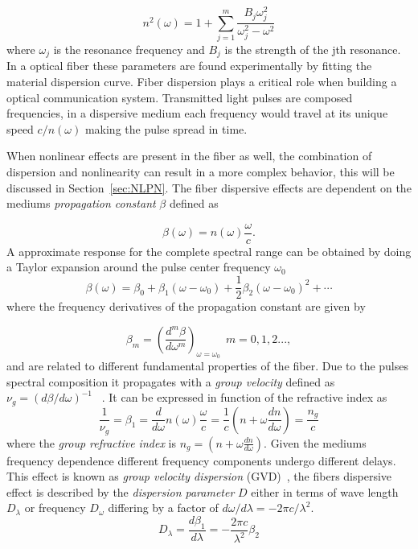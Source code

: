 \begin{equation}
n^2(\omega)=1+\sum^m_{j=1}\frac{B_j\omega^2_j}{\omega^2_j-\omega^2}
\end{equation}
 where $\omega_j$ is the resonance frequency and $B_j$ is the strength of the jth resonance. In a optical fiber these parameters are found experimentally by fitting the material dispersion curve. Fiber dispersion plays a critical role when building a optical communication system. Transmitted light pulses are composed frequencies, in a dispersive medium each frequency would travel at its unique speed $c/n(\omega)$ making the pulse spread in time.
 
 When nonlinear effects are present in the fiber as well, the combination of dispersion and nonlinearity can result in a more complex behavior, this will be discussed in Section~\ref{sec:NLPN}. The fiber dispersive effects are dependent on the mediums \textit{propagation constant} $\beta$ defined as 
 

\begin{equation}
\beta(\omega)=n(\omega)\frac{\omega}{c}.
\end{equation}
A approximate response for the complete spectral range can be obtained by doing a Taylor expansion around the pulse center frequency $\omega_0$
\begin{equation}
\beta(\omega)=\beta_0+\beta_1(\omega-\omega_0)+\frac{1}{2}\beta_2(\omega-\omega_0)^2+\dotsm
\end{equation}
where the frequency derivatives of the propagation constant are given by 

 \begin{equation}
\beta_m=\left(\frac{d^m\beta}{d\omega^m}\right)_{\omega=\omega_0} \ \  m=0,1,2...,
\end{equation}
and are related to different fundamental properties of the fiber. Due to the pulses spectral composition it propagates with a \emph{group velocity}  defined as $\nu_g=(d\beta/d\omega)^{-1}$ ~\cite{born2013principles}. It can be expressed in function of the refractive index  as
\begin{equation}
\frac{1}{\nu_g}=\beta_1=\frac{d}{d\omega}n(\omega)\frac{\omega}{c}=\frac{1}{c}\left(n+\omega\frac{dn}{d\omega}\right)=\frac{n_g}{c}\label{eq:beta1}
\end{equation}
where the \emph{group refractive index} is $n_g=\left(n+\omega\frac{dn}{d\omega}\right)$. Given the mediums frequency dependence different frequency components undergo different delays. This effect is known as \textit{group velocity dispersion} (GVD)~\cite{agrawal2000nonlinear}, the fibers dispersive effect  is described by the \emph{dispersion parameter} $D$ either in terms of wave length $D_\lambda$  or frequency  $D_\omega$ differing by a factor of $d\omega/d\lambda=-2\pi c /\lambda^2$. 
\begin{equation}
D_\lambda=\frac{d\beta_1}{d\lambda}=-\frac{2\pi c}{\lambda^2}\beta_2
\end{equation}


